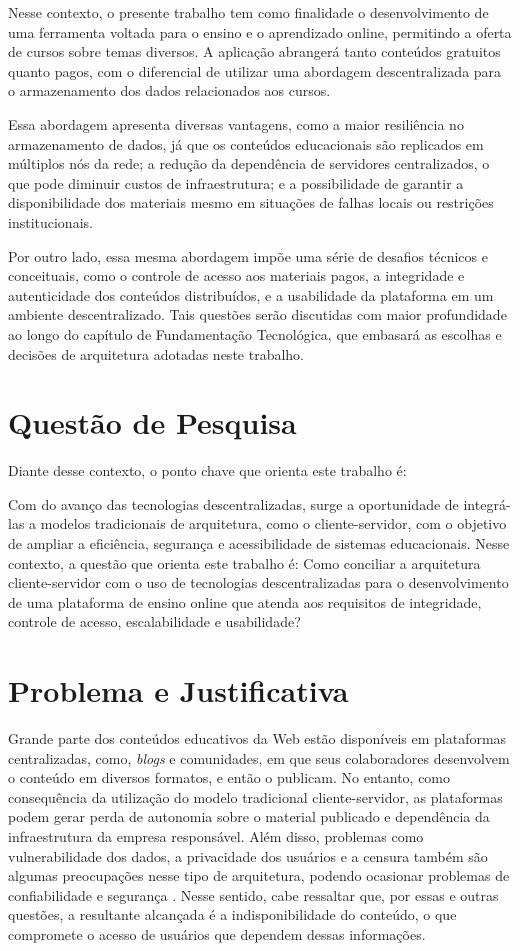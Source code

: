 Nesse contexto, o presente trabalho tem como finalidade o desenvolvimento de uma ferramenta voltada para o ensino e o aprendizado online, permitindo a oferta de cursos sobre temas diversos. A aplicação abrangerá tanto conteúdos gratuitos quanto pagos, com o diferencial de utilizar uma abordagem descentralizada para o armazenamento dos dados relacionados aos cursos.

Essa abordagem apresenta diversas vantagens, como a maior resiliência no armazenamento de dados, já que os conteúdos educacionais são replicados em múltiplos nós da rede; a redução da dependência de servidores centralizados, o que pode diminuir custos de infraestrutura; e a possibilidade de garantir a disponibilidade dos materiais mesmo em situações de falhas locais ou restrições institucionais.

Por outro lado, essa mesma abordagem impõe uma série de desafios técnicos e conceituais, como o controle de acesso aos materiais pagos, a integridade e autenticidade dos conteúdos distribuídos, e a usabilidade da plataforma em um ambiente descentralizado. Tais questões serão discutidas com maior profundidade ao longo do capítulo de Fundamentação Tecnológica, que embasará as escolhas e decisões de arquitetura adotadas neste trabalho.

\section{Questão de Pesquisa}
Diante desse contexto, o ponto chave que orienta este trabalho é:

Com do avanço das tecnologias descentralizadas, surge a oportunidade de integrá-las a modelos tradicionais de arquitetura, como o cliente-servidor, com o objetivo de ampliar a eficiência, segurança e acessibilidade de sistemas educacionais. Nesse contexto, a questão que orienta este trabalho é: Como conciliar a arquitetura cliente-servidor com o uso de tecnologias descentralizadas para o desenvolvimento de uma plataforma de ensino online que atenda aos requisitos de integridade, controle de acesso, escalabilidade e usabilidade?

\section{Problema e Justificativa}


Grande parte dos conteúdos educativos da Web estão disponíveis em plataformas centralizadas, como, \textit{blogs} e comunidades, em que seus colaboradores desenvolvem o conteúdo em diversos formatos, e então o publicam. No entanto, como consequência da utilização do modelo tradicional cliente-servidor, as plataformas podem gerar perda de autonomia sobre o material publicado e dependência da infraestrutura da empresa responsável. Além disso, problemas como vulnerabilidade dos dados, a privacidade dos usuários e a censura também são algumas preocupações nesse tipo de arquitetura, podendo ocasionar problemas de confiabilidade e segurança \cite{wanner2024}. Nesse sentido, cabe ressaltar que, por essas e outras questões, a resultante alcançada é a indisponibilidade do conteúdo, o que compromete o acesso de usuários que dependem dessas informações. 

